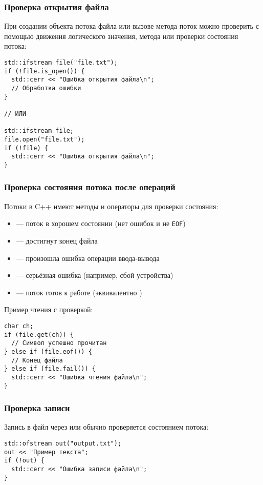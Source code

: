 \subsubsection{Проверка открытия файла}
При создании объекта потока файла или вызове метода  поток можно проверить с помощью движения логического
значения, метода  или проверки состояния потока:
\begin{verbatim}
std::ifstream file("file.txt");
if (!file.is_open()) {
  std::cerr << "Ошибка открытия файла\n";
  // Обработка ошибки
}

// ИЛИ

std::ifstream file;
file.open("file.txt");
if (!file) {
  std::cerr << "Ошибка открытия файла\n";
}
\end{verbatim}

\subsubsection{Проверка состояния потока после операций}
Потоки в C++ имеют методы и операторы для проверки состояния:
\begin{itemize}
\item {} — поток в хорошем состоянии (нет ошибок и не \verb|EOF|)
\item {} — достигнут конец файла
\item {} — произошла ошибка операции ввода-вывода
\item {} — серьёзная ошибка (например, сбой устройства)
\item {} — поток готов к работе (эквивалентно )
\end{itemize}
Пример чтения с проверкой:

\begin{verbatim}
char ch;
if (file.get(ch)) {
  // Символ успешно прочитан
} else if (file.eof()) {
  // Конец файла
} else if (file.fail()) {
  std::cerr << "Ошибка чтения файла\n";
}
\end{verbatim}
\subsubsection{Проверка записи}
Запись в файл через  или  обычно проверяется состоянием потока:
\begin{verbatim}
std::ofstream out("output.txt");
out << "Пример текста";
if (!out) {
  std::cerr << "Ошибка записи файла\n";
}
\end{verbatim}


